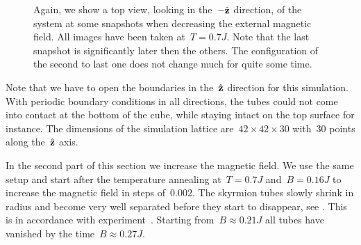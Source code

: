 \begin{figure}[H]
  \centering
  \caption{Again, we show a top view, \ie{} looking in the~$-\hat{\mathbf{z}}$ direction, of
  the system at some snapshots when decreasing the external magnetic field. All
  images have been taken at~$T=0.7 J$. Note that the last snapshot is
  significantly later then the others. The configuration of the second to last
  one does not change much for quite some time.}
\label{fig:hedgehog}
\end{figure}

Note that we have to open the boundaries in the~$\hat{\mathbf{z}}$ direction for this
simulation. With periodic boundary conditions in all directions, the tubes could
not come into contact at the bottom of the cube, while staying intact on the top
surface for instance. The dimensions of the simulation lattice are~$42 \times 42
\times 30$ with~$30$ points along the~$\hat{\mathbf{z}}$ axis.

In the second part of this section we increase the magnetic field. We
use the same setup and start after the temperature annealing at~$T = 0.7 J$
and~$B = 0.16 J$ to increase the magnetic field in steps of~$0.002$. The
skyrmion tubes slowly shrink in radius and become very well separated before
they start to disappear, see . This is in accordance
with experiment~\cite{progress}. Starting from~$B \approx 0.21 J$ all tubes have
vanished by the time~$B \approx 0.27 J$.

